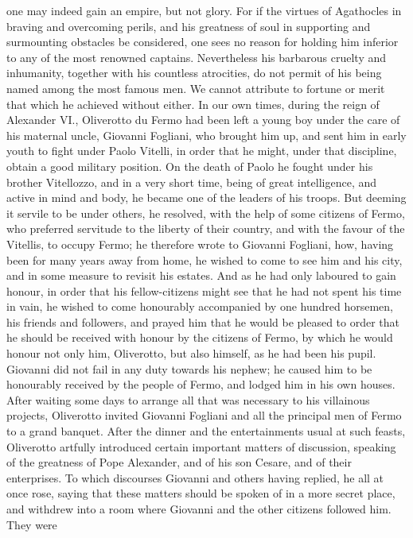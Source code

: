 \documentclass[12pt,letterpaper]{memoir}
\begin{document}
one may indeed gain an empire, but not glory. For if the virtues of
Agathocles in braving and overcoming perils, and his greatness of soul
in supporting and surmounting obstacles be considered, one sees no
reason for holding him inferior to any of the most renowned captains.
Nevertheless his barbarous cruelty and inhumanity, together with his
countless atrocities, do not permit of his being named among the
most famous men. We cannot attribute to fortune or merit that which
he achieved without either. In our own times, during the reign of
Alexander VI., Oliverotto du Fermo had been left a young boy under the
care of his maternal uncle, Giovanni Fogliani, who brought him up, and
sent him in early youth to fight under Paolo Vitelli, in order that he
might, under that discipline, obtain a good military position. On the
death of Paolo he fought under his brother Vitellozzo, and in a very
short time, being of great intelligence, and active in mind and body,
he became one of the leaders of his troops. But deeming it servile to
be under others, he resolved, with the help of some citizens of Fermo,
who preferred servitude to the liberty of their country, and with the
favour of the Vitellis, to occupy Fermo; he therefore wrote to Giovanni
Fogliani, how, having been for many years away from home, he wished
to come to see him and his city, and in some measure to revisit his
estates. And as he had only laboured to gain honour, in order that
his fellow-citizens might see that he had not spent his time in vain,
he wished to come honourably accompanied by one hundred horsemen, his
friends and followers, and prayed him that he would be pleased to
order that he should be received with honour by the citizens of Fermo,
by which he would honour not only him, Oliverotto, but also himself,
as he had been his pupil. Giovanni did not fail in any duty towards
his nephew; he caused him to be honourably received by the people of
Fermo, and lodged him in his own houses. After waiting some days to
arrange all that was necessary to his villainous projects, Oliverotto
invited Giovanni Fogliani and all the principal men of Fermo to a
grand banquet. After the dinner and the entertainments usual at such
feasts, Oliverotto artfully introduced certain important matters of
discussion, speaking of the greatness of Pope Alexander, and of his
son Cesare, and of their enterprises. To which discourses Giovanni
and others having replied, he all at once rose, saying that these
matters should be spoken of in a more secret place, and withdrew into
a room where Giovanni and the other citizens followed him. They were
\end{document}
